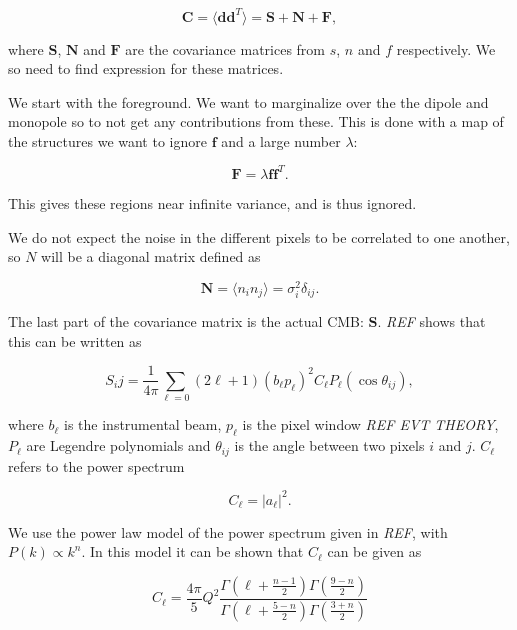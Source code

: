 \documentclass{emulateapj}
\begin{document}
\begin{equation}
\mathbf{C} = \langle \mathbf{d}\mathbf{d}^T\rangle = \mathbf{S} + \mathbf{N} + \mathbf{F},
\end{equation}

where $\mathbf{S}$, $\mathbf{N}$ and $\mathbf{F}$ are the covariance matrices from $s$, $n$ and $f$ respectively. We so need to find expression for these matrices. 

We start with the foreground. We want to marginalize over the the dipole and monopole so to not get any contributions from these. This is done with a map of the structures we want to ignore $\mathbf{f}$ and a large number $\lambda$:

\begin{equation}
\mathbf{F} = \lambda \mathbf{f}\mathbf{f}^T.
\end{equation}

This gives these regions near infinite variance, and is thus ignored.

We do not expect the noise in the different pixels to be correlated to one another, so $N$ will be a diagonal matrix defined as

\begin{equation}
\mathbf{N} = \langle n_i n_j\rangle = \sigma_i^2\delta_{ij}.
\end{equation}


The last part of the covariance matrix is the actual CMB: $\mathbf{S}$. \emph{REF} shows that this can be written as 

\begin{equation}
S_ij = \frac{1}{4\pi}\sum_{\ell=0}(2\ell + 1)(b_\ell p_\ell)^2 C_\ell P_\ell(\cos\theta_{ij}),
\end{equation}

where $b_\ell$ is the instrumental beam, $p_\ell$ is the pixel window \emph{REF EVT THEORY}, $P_\ell$ are Legendre polynomials and $\theta_{ij}$ is the angle between two pixels $i$ and $j$. $C_\ell$ refers to the power spectrum 

\begin{equation}
C_\ell = |a_\ell|^2.
\end{equation}

We use the power law model of the power spectrum given in \emph{REF}, with $P(k) \propto k^n$. In this model it can be shown that $C_\ell$ can be given as

\begin{equation}
C_\ell = \frac{4\pi}{5}Q^2\frac{\Gamma\left(\ell + \frac{n-1}{2}\right)\Gamma\left(\frac{9-n}{2}\right)}{\Gamma\left(\ell + \frac{5-n}{2}\right)\Gamma\left(\frac{3+n}{2}\right)}
\end{equation}
\end{document}
